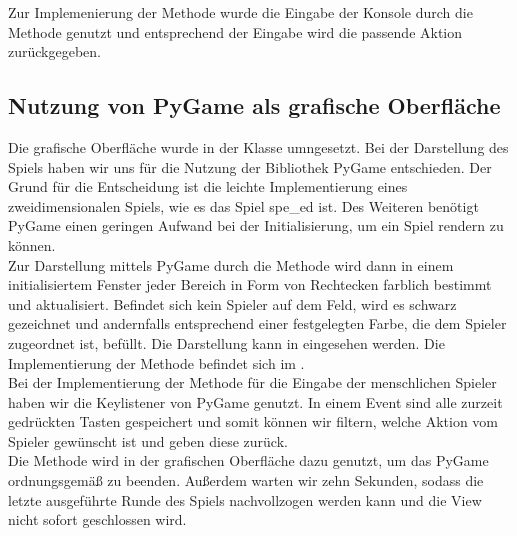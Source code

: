 Zur Implemenierung der Methode  wurde die Eingabe der Konsole durch die Methode 
genutzt und entsprechend der Eingabe wird die passende Aktion zurückgegeben.

\subsection{Nutzung von PyGame als grafische Oberfläche}
\label{subsec:oberflaeche-pygame}

Die grafische Oberfläche wurde in der Klasse  umngesetzt.
Bei der Darstellung des Spiels haben wir uns für die Nutzung der Bibliothek PyGame entschieden.
Der Grund für die Entscheidung ist die leichte Implementierung eines zweidimensionalen Spiels, wie es das Spiel
spe\_ed ist.
Des Weiteren benötigt PyGame einen geringen Aufwand bei der Initialisierung, um ein Spiel rendern zu können. \\

Zur Darstellung mittels PyGame durch die Methode  wird dann in einem initialisiertem Fenster
jeder Bereich in Form von Rechtecken farblich bestimmt und aktualisiert.
Befindet sich kein Spieler auf dem Feld, wird es schwarz gezeichnet und andernfalls entsprechend einer festgelegten
Farbe, die dem Spieler zugeordnet ist, befüllt.
Die Darstellung kann in  eingesehen werden.
Die Implementierung der Methode befindet sich im . \\

Bei der Implementierung der Methode  für die Eingabe der menschlichen Spieler haben wir die
Keylistener von PyGame genutzt.
In einem Event sind alle zurzeit gedrückten Tasten gespeichert und somit können wir filtern, welche Aktion vom Spieler
gewünscht ist und geben diese zurück. \\

Die Methode  wird in der grafischen Oberfläche dazu genutzt, um das PyGame ordnungsgemäß zu beenden.
Außerdem warten wir zehn Sekunden, sodass die letzte ausgeführte Runde des Spiels nachvollzogen werden kann und die
View nicht sofort geschlossen wird.
